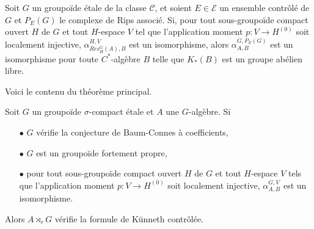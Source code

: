 \begin{itemize}
\begin{thmfr}
Soit $G$ un groupoïde étale de la classe $\mathcal C$, et soient $E\in\mathcal E$ un ensemble contrôlé de $G$ et $P_E(G)$ le complexe de Rips associé. Si, pour tout sous-groupoïde compact ouvert $H$ de $G$ et tout $H$-espace $V$ tel que l'application moment $p : V\rightarrow H^{(0)}$ soit localement injective, $\alpha_{Res_H^G(A),B}^{H,V}$ est un isomorphisme, alors $\alpha_{A,B}^{G,P_E(G)}$ est un isomorphisme pour toute $C^*$-algèbre $B$ telle que $K_*(B)$ est un groupe abélien libre.\\
\end{thmfr}

Voici le contenu du théorème principal.\\

\begin{thmfr}
Soit $G$ un groupoïde $\sigma$-compact étale et $A$ une $G$-algèbre. Si 
\begin{itemize}
\item[$\bullet$] $G$ vérifie la conjecture de Baum-Connes à coefficients,
\item[$\bullet$] $G$ est un groupoïde fortement propre,
\item[$\bullet$] pour tout sous-groupoïde compact ouvert $H$ de $G$ et tout $H$-espace $V$ tels que l'application moment $p : V\rightarrow H^{(0)}$ soit localement injective, $\alpha_{A,B}^{G,V}$ est un isomorphisme.
\end{itemize} 
Alors $A\rtimes_r G$ vérifie la formule de Künneth contrôlée.
\end{thmfr}

\end{itemize}

































